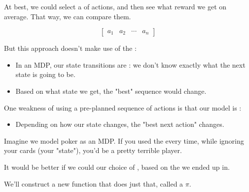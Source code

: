         At best, we could select a  of actions, and then see what reward we get on average. That way, we can compare them.

        \begin{equation}
            \begin{bmatrix}
                a_1 & a_2 & \cdots & a_n
            \end{bmatrix}
        \end{equation}

        But this approach doesn't make use of the :
    
        \begin{itemize}
            \item In an MDP, our state transitions are : we don't know exactly what the next state is going to be. 
            \item Based on what state we get, the "best" sequence would change.\\
        \end{itemize}

        \begin{concept}
            One weakness of using a pre-planned sequence of actions is that our model is :

            \begin{itemize}
                \item Depending on how our state  changes, the "best next action" changes.
            \end{itemize}
        \end{concept}

        \miniex Imagine we model poker as an MDP. If you used the  every time, while ignoring your cards (your "state"), you'd be a pretty terrible player.

        It would be better if we could  our choice of , based on the  we ended up in.

        We'll construct a new function that does just that, called a  $\pi$.\\

